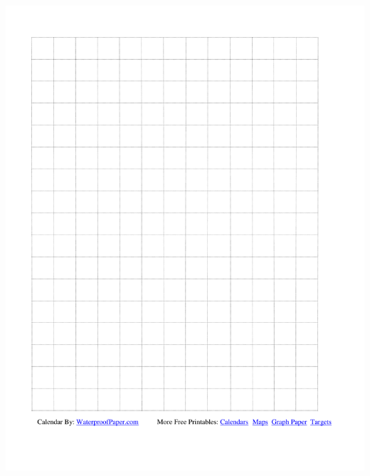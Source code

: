 \documentclass{article}
\begin{document}
\includegraphics[width=\textwidth]{graph-paper}
\end{document}
